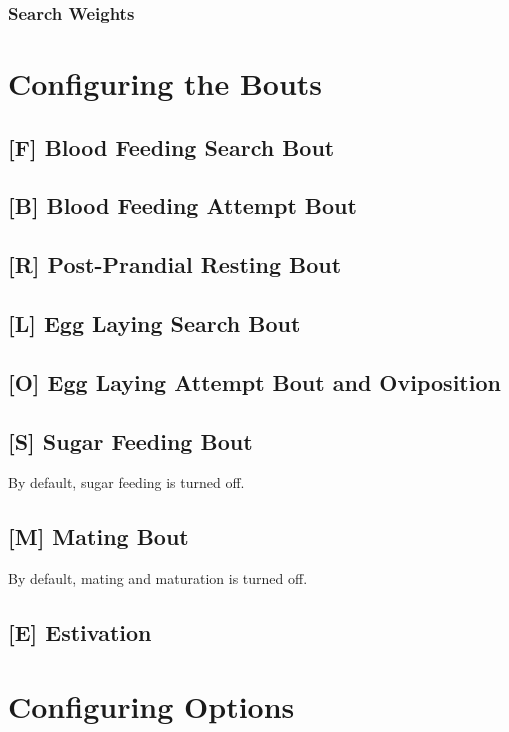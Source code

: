 \documentclass{article}
\begin{document}
\subsubsection{Search Weights}

\section{Configuring the Bouts}

\subsection*{[F] Blood Feeding Search Bout}

\subsection*{[B] Blood Feeding Attempt Bout}

\subsection*{[R] Post-Prandial Resting Bout}

\subsection*{[L] Egg Laying Search Bout}

\subsection*{[O] Egg Laying Attempt Bout and Oviposition}

\subsection*{[S] Sugar Feeding Bout}

By default, sugar feeding is turned off. 

\subsection*{[M] Mating Bout}

By default, mating and maturation is turned off. 

\subsection*{[E] Estivation}

\section{Configuring Options}
\end{document}
